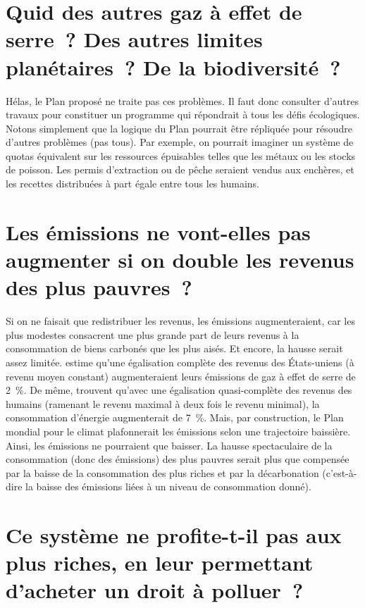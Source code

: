 \documentclass[a5paper,french,openany]{memoir}
\begin{document}
\section*{\normalsize Quid des autres gaz à effet de serre~? Des autres limites planétaires~? De la biodiversité~?}\label{q:scope}

Hélas, le Plan proposé ne traite pas ces problèmes. Il faut donc consulter d'autres travaux pour constituer un programme qui répondrait à tous les défis écologiques. %
Notons simplement que la logique du Plan pourrait être répliquée pour résoudre d'autres problèmes (pas tous). Par exemple, on pourrait imaginer un système de quotas équivalent sur les ressources épuisables telles que les métaux ou les stocks de poisson. Les permis d'extraction %
ou de pêche seraient vendus aux enchères, et les recettes distribuées à part égale entre tous les humains.

\section*{\normalsize Les émissions ne vont-elles pas augmenter si on double les revenus des plus pauvres~?}\label{q:emissions}

Si on ne faisait que redistribuer les revenus, les émissions augmenteraient, car les plus modestes consacrent une plus grande part de leurs revenus à la consommation de biens carbonés que les plus aisés. Et encore, la hausse serait assez limitée. \cite{sager_income_2019} estime qu'une égalisation complète des revenus des États-uniens (à revenu moyen constant) augmenteraient leurs émissions de gaz à effet de serre de 2~\%. De même, \cite{oswald_global_2021} trouvent qu'avec une égalisation quasi-complète des revenus des humains (ramenant le revenu maximal à deux fois le revenu minimal), la consommation d'énergie augmenterait de 7~\%. 
Mais, par construction, le Plan mondial pour le climat plafonnerait les émissions selon une trajectoire baissière. Ainsi, les émissions ne pourraient que baisser. La hausse spectaculaire de la consommation (donc des émissions) des plus pauvres serait plus que compensée par la baisse de la consommation des plus riches et par la décarbonation (c'est-à-dire la baisse des émissions liées à un niveau de consommation donné).

\section*{\normalsize Ce système ne profite-t-il pas aux plus riches, en leur permettant d'acheter un droit à polluer~?}\label{q:riches}
\end{document}
